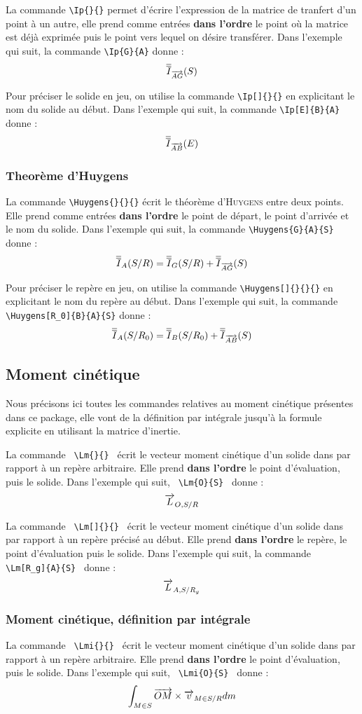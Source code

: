 \documentclass[12pt]{article}
\begin{document}
La commande \verb|\Ip{}{}| permet d'écrire l'expression de la matrice de tranfert d'un point à un autre, elle prend comme entrées \textbf{dans l'ordre} le point où la matrice est déjà exprimée puis le point vers lequel on désire transférer. Dans l'exemple qui suit, la commande \verb|\Ip{G}{A}| donne : $$\Ip{G}{A}$$

Pour préciser le solide en jeu, on utilise la commande \verb|\Ip[]{}{}| en explicitant le nom du solide au début. Dans l'exemple qui suit, la commande \verb|\Ip[E]{B}{A}| donne : $$\Ip[E]{B}{A}$$

\subsubsection{Theorème d'Huygens}

La commande \verb|\Huygens{}{}{}| écrit le théorème d'\textsc{Huygens} entre deux points. Elle prend comme entrées \textbf{dans l'ordre} le point de départ, le point d'arrivée et le nom du solide. Dans l'exemple qui suit, la commande \verb|\Huygens{G}{A}{S}| donne : $$\Huygens{G}{A}{S}$$

Pour préciser le repère en jeu, on utilise la commande \verb|\Huygens[]{}{}{}| en explicitant le nom du repère au début. Dans l'exemple qui suit, la commande \verb|\Huygens[R_0]{B}{A}{S}| donne : $$\Huygens[R_0]{B}{A}{S}$$

\subsection{Moment cinétique}
Nous précisons ici toutes les commandes relatives au moment cinétique présentes dans ce package, elle vont de la définition par intégrale jusqu'à la formule explicite en utilisant la matrice d'inertie.
\vspace{12pt}

La commande \verb| \Lm{}{} | écrit le vecteur moment cinétique d'un solide dans par rapport à un repère arbitraire. Elle prend \textbf{dans l'ordre} le point d'évaluation, puis le solide. Dans l'exemple qui suit, \verb| \Lm{O}{S} | donne : $$\Lm{O}{S}$$

La commande \verb| \Lm[]{}{} | écrit le vecteur moment cinétique d'un solide dans par rapport à un repère précisé au début. Elle prend \textbf{dans l'ordre} le repère, le point d'évaluation puis le solide. Dans l'exemple qui suit, la commande \verb| \Lm[R_g]{A}{S} | donne : $$\Lm[R_g]{A}{S}$$

\subsubsection{Moment cinétique, définition par intégrale}
La commande \verb| \Lmi{}{} | écrit le vecteur moment cinétique d'un solide dans par rapport à un repère arbitraire. Elle prend \textbf{dans l'ordre} le point d'évaluation, puis le solide. Dans l'exemple qui suit, \verb| \Lmi{O}{S} | donne : $$\Lmi{O}{S}$$
\end{document}
